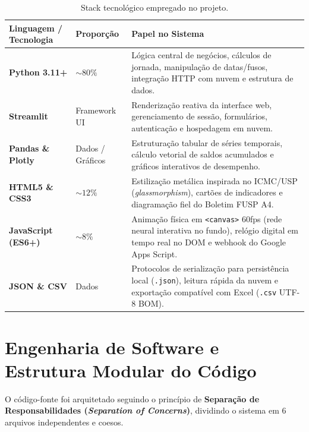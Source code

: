 \documentclass[11pt,a4paper]{article}
\begin{document}
\begin{table}[ht!]
\centering
\renewcommand{\arraystretch}{1.35}
\begin{tabularx}{\textwidth}{>{\bfseries\color{icmcDark}}l l X}
\toprule
\textbf{Linguagem / Tecnologia} & \textbf{Proporção} & \textbf{Papel no Sistema} \\
\midrule
Python 3.11+ & $\sim 80\%$ & Lógica central de negócios, cálculos de jornada, manipulação de datas/fusos, integração HTTP com nuvem e estrutura de dados. \\
Streamlit & Framework UI & Renderização reativa da interface web, gerenciamento de sessão, formulários, autenticação e hospedagem em nuvem. \\
Pandas \& Plotly & Dados / Gráficos & Estruturação tabular de séries temporais, cálculo vetorial de saldos acumulados e gráficos interativos de desempenho. \\
HTML5 \& CSS3 & $\sim 12\%$ & Estilização metálica inspirada no ICMC/USP (\textit{glassmorphism}), cartões de indicadores e diagramação fiel do Boletim FUSP A4. \\
JavaScript (ES6+) & $\sim 8\%$ & Animação física em \texttt{<canvas>} 60fps (rede neural interativa no fundo), relógio digital em tempo real no DOM e webhook do Google Apps Script. \\
JSON \& CSV & Dados & Protocolos de serialização para persistência local (\texttt{.json}), leitura rápida da nuvem e exportação compatível com Excel (\texttt{.csv} UTF-8 BOM). \\
\bottomrule
\end{tabularx}
\caption{Stack tecnológico empregado no projeto.}
\end{table}

\section{Engenharia de Software e Estrutura Modular do Código}

O código-fonte foi arquitetado seguindo o princípio de \textbf{Separação de Responsabilidades (\textit{Separation of Concerns})}, dividindo o sistema em 6 arquivos independentes e coesos.
\end{document}
